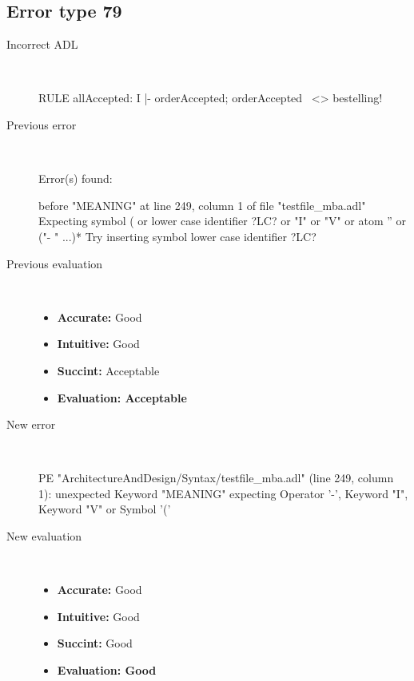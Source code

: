 \subsection{Error type 79}
  \begin{description}
  \item[Incorrect ADL]~\\
\begin{adl}
RULE allAccepted: I |- orderAccepted; orderAccepted~ <> bestelling!\end{adl}
  \item[Previous error]~\\
\begin{haskell}
Error(s) found:

before "MEANING" at line 249, column 1 of file "testfile_mba.adl"
Expecting symbol ( or lower case identifier ?LC? or "I" or "V" or atom '' or ("-
" ...)*
Try inserting symbol lower case identifier ?LC?\end{haskell}
  \item[Previous evaluation]~\\
    \begin{itemize}
    \item \textbf{Accurate:} Good
    \item \textbf{Intuitive:} Good
    \item \textbf{Succint:} Acceptable
    \item \textbf{Evaluation: Acceptable}
    \end{itemize}
  \item[New error]~\\
\begin{haskell}
PE "ArchitectureAndDesign/Syntax/testfile_mba.adl" (line 249, column 1):
unexpected Keyword "MEANING"
expecting Operator '-', Keyword "I", Keyword "V" or Symbol '('
\end{haskell}
  \item[New evaluation]~\\
    \begin{itemize}
    \item \textbf{Accurate:} Good
    \item \textbf{Intuitive:} Good
    \item \textbf{Succint:} Good
    \item \textbf{Evaluation: Good
}
    \end{itemize}
  \end{description}

\hrulefill

